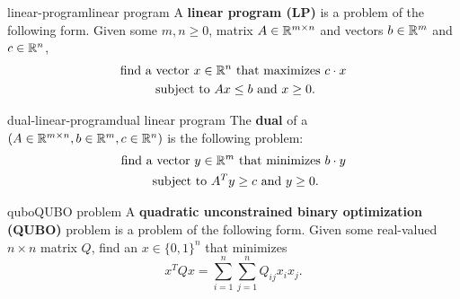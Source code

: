 \begin{topic}{linear-program}{linear program}
    A \textbf{linear program (LP)} is a problem of the following form. Given some $m, n \ge 0$, matrix $A \in \mathbb{R}^{m \times n}$ and vectors $b \in \mathbb{R}^m$ and $c \in \mathbb{R}^n$,
    \[ \begin{gathered}
        \textup{find a vector } x \in \mathbb{R}^n \textup{ that maximizes } c \cdot x \\
        \textup{ subject to } Ax \le b \textup{ and } x \ge 0 .
    \end{gathered} \]
\end{topic}

\begin{topic}{dual-linear-program}{dual linear program}
    The \textbf{dual} of a  $(A \in \mathbb{R}^{m \times n}, b \in \mathbb{R}^m, c \in \mathbb{R}^n)$ is the following problem:
    \[ \begin{gathered}
        \textup{find a vector } y \in \mathbb{R}^m \textup{ that minimizes } b \cdot y \\
        \textup{ subject to } A^T y \ge c \textup{ and } y \ge 0 .
    \end{gathered} \]
\end{topic}

\begin{topic}{qubo}{QUBO problem}
    A \textbf{quadratic unconstrained binary optimization (QUBO)} problem is a problem of the following form. Given some real-valued $n \times n$ matrix $Q$, find an $x \in \{ 0, 1 \}^n$ that minimizes
    \[ x^T Q x = \sum_{i = 1}^{n} \sum_{j = 1}^{n} Q_{ij} x_i x_j . \]
\end{topic}
